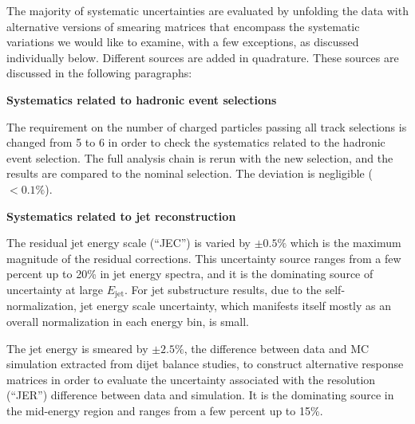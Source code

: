 \documentclass[aps,preprint,superscriptaddress,groupedaddress]{revtex4}  %
\begin{document}
The majority of systematic uncertainties are evaluated by unfolding the data with alternative versions of smearing matrices that encompass the systematic variations we would like to examine, with a few exceptions, as discussed individually below.  Different sources are added in quadrature.  These sources are discussed in the following paragraphs:

\textbf{Systematics related to hadronic event selections}

The requirement on the number of charged particles passing all track selections is changed from 5 to 6 in order to check the systematics related to the hadronic event selection.  The full analysis chain is rerun with the new selection, and the results are compared to the nominal selection.  The deviation is negligible ($< 0.1\%$).


\textbf{Systematics related to jet reconstruction}

The residual jet energy scale (``JEC'') is varied by $\pm 0.5\%$ which is the maximum magnitude of the residual corrections.  This uncertainty source ranges from a few percent up to 20\% in jet energy spectra, and it is the dominating source of uncertainty at large $E_\text{jet}$.  For jet substructure results, due to the self-normalization, jet energy scale uncertainty, which manifests itself mostly as an overall normalization in each energy bin, is small.

The jet energy is smeared by $\pm2.5\%$, the difference between data and MC simulation extracted from dijet balance studies, to construct alternative response matrices in order to evaluate the uncertainty associated with the resolution (``JER'') difference between data and simulation.  It is the dominating source in the mid-energy region and ranges from a few percent up to 15\%.
\end{document}
